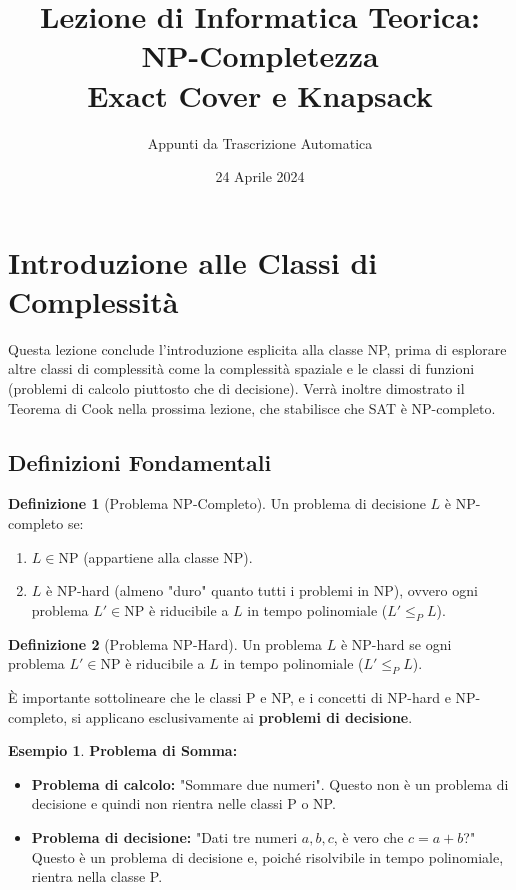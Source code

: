 \documentclass[a4paper]{article}
\title{Lezione di Informatica Teorica: NP-Completezza \\ Exact Cover e Knapsack}
\author{Appunti da Trascrizione Automatica}
\date{24 Aprile 2024}
\theoremstyle{definition} %
\newtheorem{definition}{Definizione}
\newtheorem{example}{Esempio}
\begin{document}
\maketitle
\tableofcontents
\newpage

\section{Introduzione alle Classi di Complessità}

Questa lezione conclude l'introduzione esplicita alla classe NP, prima di esplorare altre classi di complessità come la complessità spaziale e le classi di funzioni (problemi di calcolo piuttosto che di decisione). Verrà inoltre dimostrato il Teorema di Cook nella prossima lezione, che stabilisce che SAT è NP-completo.

\subsection{Definizioni Fondamentali}

\begin{definition}[Problema NP-Completo]
Un problema di decisione $L$ è NP-completo se:
\begin{enumerate}
    \item $L \in \text{NP}$ (appartiene alla classe NP).
    \item $L$ è NP-hard (almeno "duro" quanto tutti i problemi in NP), ovvero ogni problema $L' \in \text{NP}$ è riducibile a $L$ in tempo polinomiale ($L' \le_P L$).
\end{enumerate}
\end{definition}

\begin{definition}[Problema NP-Hard]
Un problema $L$ è NP-hard se ogni problema $L' \in \text{NP}$ è riducibile a $L$ in tempo polinomiale ($L' \le_P L$).
\end{definition}

È importante sottolineare che le classi P e NP, e i concetti di NP-hard e NP-completo, si applicano esclusivamente ai \textbf{problemi di decisione}.

\begin{example}
\textbf{Problema di Somma:}
\begin{itemize}
    \item \textbf{Problema di calcolo:} "Sommare due numeri". Questo non è un problema di decisione e quindi non rientra nelle classi P o NP.
    \item \textbf{Problema di decisione:} "Dati tre numeri $a, b, c$, è vero che $c = a+b$?" Questo è un problema di decisione e, poiché risolvibile in tempo polinomiale, rientra nella classe P.
\end{itemize}
\end{example}
\end{document}
